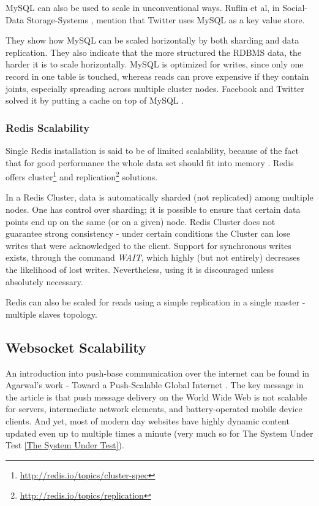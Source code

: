 \documentclass{uvamscse}
\begin{document}
MySQL can also be used to scale in unconventional ways. Ruflin et al, in Social-Data Storage-Systems \cite{SoDaSS}, mention that Twitter uses MySQL as a key value store.

They show how MySQL can be scaled horizontally by both sharding and data replication. They also indicate that the more structured the RDBMS data, the harder it is to scale horizontally. MySQL is optimized for writes, since only one record in one table is touched, whereas reads can prove expensive if they contain joints, especially spreading across multiple cluster nodes. Facebook and Twitter solved it by putting a cache on top of MySQL \cite{SoDaSS}.

\subsubsection{Redis Scalability}
Single Redis installation is said to be of limited scalability, because of the fact that for good performance the whole data set should fit into memory \cite{SoDaSS}. Redis offers cluster\footnote{\url{http://redis.io/topics/cluster-spec}} and replication\footnote{\url{http://redis.io/topics/replication}} solutions.

In a Redis Cluster, data is automatically sharded (not replicated) among multiple nodes. One has control over sharding; it is possible to ensure that certain data points end up on the same (or on a given) node. Redis Cluster does not guarantee strong consistency - under certain conditions the Cluster can lose writes that were acknowledged to the client. Support for synchronous writes exists, through the command \textit{WAIT}, which highly (but not entirely) decreases the likelihood of lost writes. Nevertheless, using it is discouraged unless absolutely necessary.

Redis can also be scaled for reads using a simple replication in a single master - multiple slaves topology.

\subsection{Websocket Scalability}

An introduction into push-base communication over the internet can be found in Agarwal’s work - Toward a Push-Scalable Global Internet \cite{PushScale}. The key message in the article is that push message delivery on the World Wide Web is not scalable for servers, intermediate network elements, and battery-operated mobile device clients. And yet, most of modern day websites have highly dynamic content updated even up to multiple times a minute (very much so for The System Under Test \ref{The System Under Test}).
\end{document}
